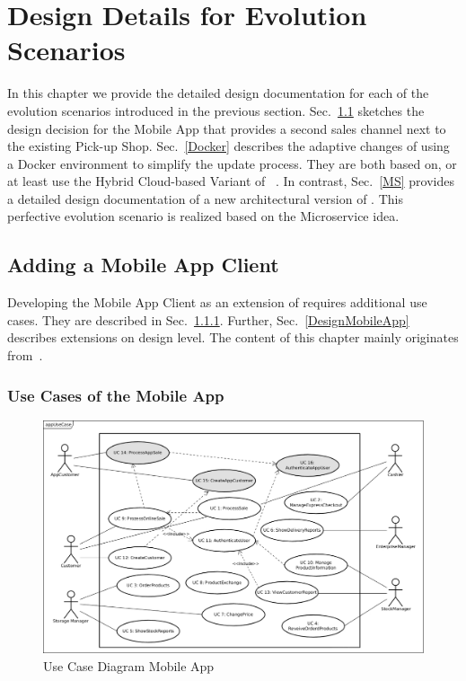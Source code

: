 
\chapter{Design Details for Evolution Scenarios}
\label{c:design}
In this chapter we provide the detailed design documentation for each of the evolution scenarios introduced in the previous section. 
Sec.~\ref{App} sketches the design decision for the Mobile App that provides a second sales channel next to the existing Pick-up Shop. Sec.~\ref{Docker} describes the adaptive changes of using a Docker environment to simplify the update process. They are both based on, or at least use the Hybrid Cloud-based Variant of \CoCoME~\cite{HeinrichRostamiReussner2016_1000052688}. In contrast, Sec.~\ref{MS} provides a detailed design documentation of a new architectural version of \CoCoME. This perfective evolution scenario is realized based on the Microservice idea.

\section{Adding a Mobile App Client} 
\label{App}
Developing the Mobile App Client as an extension of \CoCoME requires additional use cases. They are described in Sec.~\ref{UseCasesMobileApp}. Further, Sec.~\ref{DesignMobileApp} describes extensions on design level. The content of this chapter mainly originates from~\cite{schnabel}.

\subsection{Use Cases of the Mobile App}
\label{UseCasesMobileApp}
\begin{figure}[t]
	\includegraphics[width=\textwidth]{img/appUseCase.jpg}
	\caption{Use Case Diagram \CoCoME Mobile App}
\end{figure}

